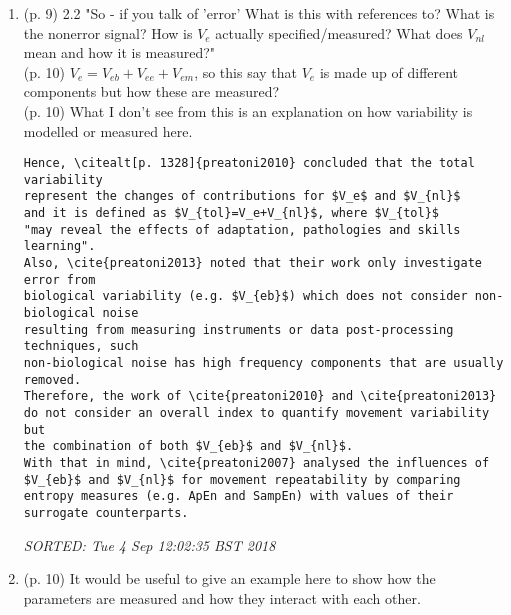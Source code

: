 \documentclass[10pt]{article}
\begin{document}
\begin{enumerate}[noitemsep,topsep=0pt]
\item (p. 9) 2.2 "So - if you talk of 'error'  What is this with references to?
	What is the nonerror signal?
	How is $V_e$ actually specified/measured?
	What does $V_{nl}$ mean and how it is measured?" \\
	(p. 10) $V_e= V_{eb} +  V_{ee}+ V_{em}  $, so this say that $V_{e}$
	is made up of different components but 
	how these are measured? \\
	(p. 10) What I don't see from this is an explanation on how variability 
	is modelled or measured here. 
\begin{verbatim}
Hence, \citealt[p. 1328]{preatoni2010} concluded that the total variability 
represent the changes of contributions for $V_e$ and $V_{nl}$ 
and it is defined as $V_{tol}=V_e+V_{nl}$, where $V_{tol}$ 
"may reveal the effects of adaptation, pathologies and skills learning".
Also, \cite{preatoni2013} noted that their work only investigate error from 
biological variability (e.g. $V_{eb}$) which does not consider non-biological noise 
resulting from measuring instruments or data post-processing techniques, such 
non-biological noise has high frequency components that are usually removed.
Therefore, the work of \cite{preatoni2010} and \cite{preatoni2013} 
do not consider an overall index to quantify movement variability but 
the combination of both $V_{eb}$ and $V_{nl}$. 
With that in mind, \cite{preatoni2007} analysed the influences of 
$V_{eb}$ and $V_{nl}$ for movement repeatability by comparing 
entropy measures (e.g. ApEn and SampEn) with values of their surrogate counterparts.
\end{verbatim}
\textit{
SORTED:  Tue  4 Sep 12:02:35 BST 2018
}
\\


\item (p. 10) It would be useful to give an example here to show 
	how the parameters are measured and how they interact with each other.



\end{enumerate}
\end{document}

